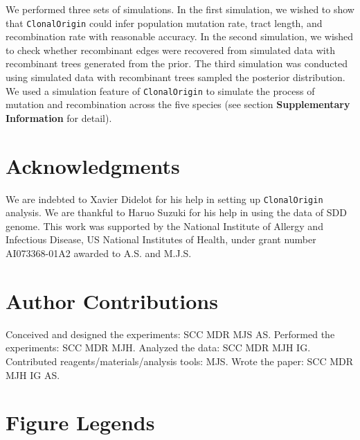\documentclass[10pt]{article}
\begin{document}
We performed three sets of simulations.  In the first simulation, we wished to
show that \texttt{ClonalOrigin} could infer population mutation rate, tract
length, and recombination rate with reasonable accuracy. In the second
simulation, we wished to check whether recombinant edges were recovered from
simulated data with recombinant trees generated from the prior. The third
simulation was conducted using simulated data with recombinant trees sampled the
posterior distribution.  We used a simulation feature of \texttt{ClonalOrigin}
to simulate the process of mutation and recombination across the five species
(see section \textbf{Supplementary Information} for detail).


\section*{Acknowledgments}

We are indebted to Xavier Didelot for his help in setting up \texttt{ClonalOrigin}
analysis.  We are thankful to Haruo Suzuki for his help
in using the data of SDD genome. This work was supported by the National
Institute of Allergy and Infectious Disease, US National Institutes
of Health, under grant number AI073368-01A2 awarded to A.S. and M.J.S.

\section*{Author Contributions}

Conceived and designed the experiments: SCC MDR MJS AS.
Performed the experiments: SCC MDR MJH.
Analyzed the data: SCC MDR MJH IG.
Contributed reagents/materials/analysis tools: MJS.
Wrote the paper: SCC MDR MJH IG AS.



\clearpage{}

\section*{Figure Legends}
\end{document}
